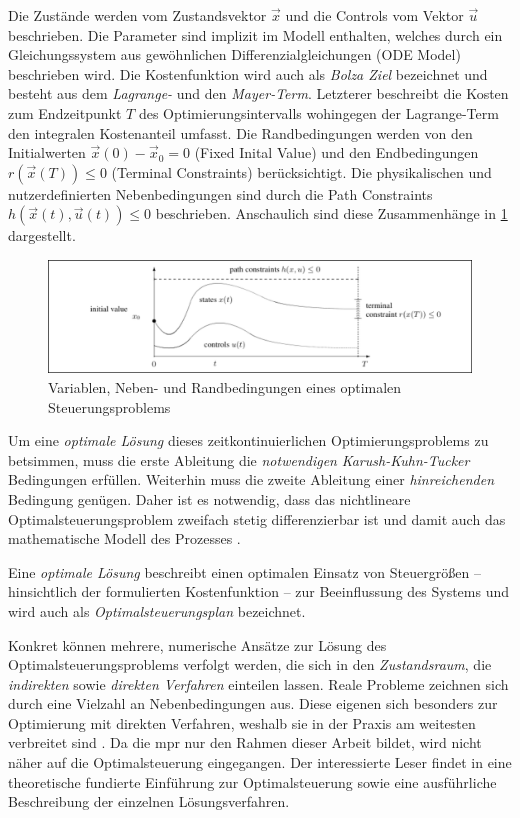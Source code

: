 Die Zustände werden vom Zustandsvektor $\vec{x}$ und die Controls vom Vektor $\vec{u}$ beschrieben. Die Parameter sind implizit im Modell enthalten, welches durch ein Gleichungssystem aus gewöhnlichen Differenzialgleichungen (ODE Model) beschrieben wird. Die Kostenfunktion wird auch als \textit{Bolza Ziel} bezeichnet und besteht aus dem \textit{Lagrange-} und den \textit{Mayer-Term}. Letzterer beschreibt die Kosten zum Endzeitpunkt $T$ des Optimierungsintervalls wohingegen der Lagrange-Term den integralen Kostenanteil umfasst. Die Randbedingungen werden von den Initialwerten $\vec{x}(0)-\vec{x}_{0} = 0$ (Fixed Inital Value) und den Endbedingungen $r(\vec{x}(T)) \leq 0$ (Terminal Constraints) berücksichtigt. Die physikalischen und nutzerdefinierten Nebenbedingungen sind durch die Path Constraints $h(\vec{x}(t),\vec{u}(t)) \leq 0$ beschrieben. Anschaulich sind diese Zusammenhänge in \ref{fig:opt} dargestellt.

\begin{figure}
\centering
\includegraphics[width=\textwidth]{abbildungen/20160327_mpc}
\caption[Variablen, Neben- und Randbedingungen eines optimalen Steuerungsproblems]{Variablen, Neben- und Randbedingungen eines optimalen Steuerungsproblems \cite[S.61]{di14}}
\label{fig:opt}
\end{figure}

Um eine \textit{optimale Lösung} dieses zeitkontinuierlichen Optimierungsproblems zu betsimmen, muss die erste Ableitung die \textit{notwendigen} \textit{Karush-Kuhn-Tucker} Bedingungen erfüllen. Weiterhin muss die zweite Ableitung einer \textit{hinreichenden} Bedingung genügen. Daher ist es notwendig, dass das nichtlineare Optimalsteuerungsproblem zweifach stetig differenzierbar ist und damit auch das mathematische Modell des Prozesses \cite[S.~21ff.]{di14}.

Eine \textit{optimale Lösung} beschreibt einen optimalen Einsatz von Steuergrößen -- hinsichtlich der formulierten Kostenfunktion -- zur Beeinflussung des Systems und wird auch als \textit{Optimalsteuerungsplan} bezeichnet.

Konkret können mehrere, numerische Ansätze zur Lösung des Optimalsteuerungsproblems verfolgt werden, die sich in den \textit{Zustandsraum}, die \textit{indirekten} sowie \textit{direkten Verfahren} einteilen lassen. Reale Probleme zeichnen sich durch eine Vielzahl an Nebenbedingungen aus. Diese eigenen sich besonders zur Optimierung mit direkten Verfahren, weshalb sie in der Praxis am weitesten verbreitet sind \cite[S.~63]{di14}. 
Da die \acrlong{mpr} nur den Rahmen dieser Arbeit bildet, wird nicht näher auf die Optimalsteuerung eingegangen. Der interessierte Leser findet in \cite{di14} eine theoretische fundierte Einführung zur Optimalsteuerung sowie eine ausführliche Beschreibung der einzelnen Lösungsverfahren.

